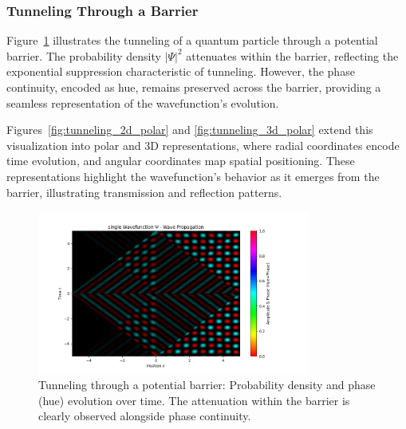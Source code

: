 \documentclass[12pt]{article}
\begin{document}
\subsubsection{Tunneling Through a Barrier}

Figure~\ref{fig:tunneling_density} illustrates the tunneling of a quantum particle through a potential barrier. The probability density \(|\Psi|^2\) attenuates within the barrier, reflecting the exponential suppression characteristic of tunneling. However, the phase continuity, encoded as hue, remains preserved across the barrier, providing a seamless representation of the wavefunction's evolution.

Figures~\ref{fig:tunneling_2d_polar} and \ref{fig:tunneling_3d_polar} extend this visualization into polar and 3D representations, where radial coordinates encode time evolution, and angular coordinates map spatial positioning. These representations highlight the wavefunction’s behavior as it emerges from the barrier, illustrating transmission and reflection patterns.

\begin{figure}[H]
\centering
\includegraphics[width=0.8\textwidth]{images/tunneling_wavefunction_probability_density_with_phase.png}
\caption{Tunneling through a potential barrier: Probability density and phase (hue) evolution over time. The attenuation within the barrier is clearly observed alongside phase continuity.}
\label{fig:tunneling_density}
\end{figure}
\end{document}

